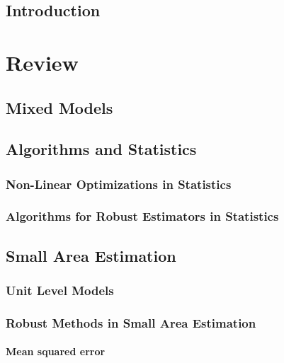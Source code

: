 

\chapter{Introduction}



\part{Review}\label{part:theory}

\chapter{Mixed Models}

\chapter{Algorithms and Statistics}
\section{Non-Linear Optimizations in Statistics}
\section{Algorithms for Robust Estimators in Statistics}

\chapter{Small Area Estimation}
\section{Unit Level Models}




\section{Robust Methods in Small Area Estimation}

\subsection{Mean squared error}
